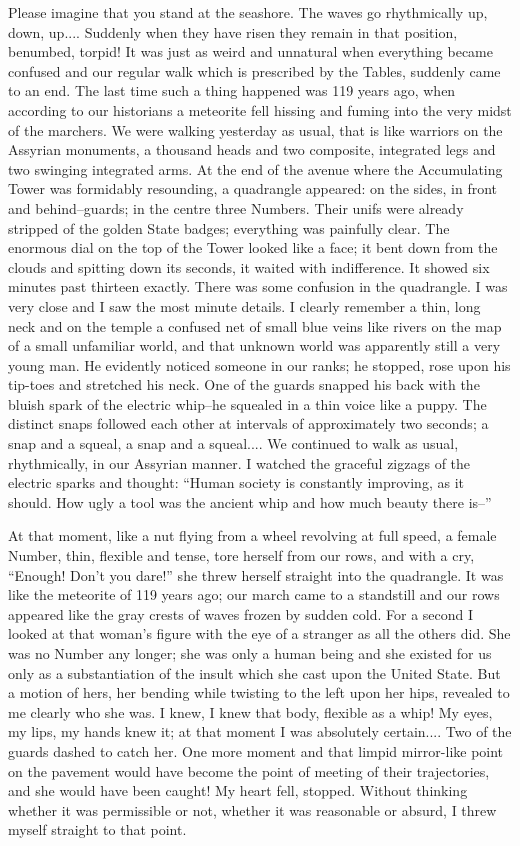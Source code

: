 \documentclass[11pt,openany]{book}
\begin{document}
Please imagine that you stand at the seashore. The waves go rhythmically up, down, up.... Suddenly when they have risen they remain in that position, benumbed, torpid! It was just as weird and unnatural when everything became confused and our regular walk which is prescribed by the Tables, suddenly came to an end. The last time such a thing happened was 119 years ago, when according to our historians a meteorite fell hissing and fuming into the very midst of the marchers. We were walking yesterday as usual, that is like warriors on the Assyrian monuments, a thousand heads and two composite, integrated legs and two swinging integrated arms. At the end of the avenue where the Accumulating Tower was formidably resounding, a quadrangle appeared: on the sides, in front and behind--guards; in the centre three Numbers. Their unifs were already stripped of the golden State badges; everything was painfully clear. The enormous dial on the top of the Tower looked like a face; it bent down from the clouds and spitting down its seconds, it waited with indifference. It showed six minutes past thirteen exactly. There was some confusion in the quadrangle. I was very close and I saw the most minute details. I clearly remember a thin, long neck and on the temple a confused net of small blue veins like rivers on the map of a small unfamiliar world, and that unknown world was apparently still a very young man. He evidently noticed someone in our ranks; he stopped, rose upon his tip-toes and stretched his neck. One of the guards snapped his back with the bluish spark of the electric whip--he squealed in a thin voice like a puppy. The distinct snaps followed each other at intervals of approximately two seconds; a snap and a squeal, a snap and a squeal.... We continued to walk as usual, rhythmically, in our Assyrian manner. I watched the graceful zigzags of the electric sparks and thought: ``Human society is constantly improving, as it should. How ugly a tool was the ancient whip and how much beauty there is--''

At that moment, like a nut flying from a wheel revolving at full speed, a female Number, thin, flexible and tense, tore herself from our rows, and with a cry, ``Enough! Don't you dare!'' she threw herself straight into the quadrangle. It was like the meteorite of 119 years ago; our march came to a standstill and our rows appeared like the gray crests of waves frozen by sudden cold. For a second I looked at that woman's figure with the eye of a stranger as all the others did. She was no Number any longer; she was only a human being and she existed for us only as a substantiation of the insult which she cast upon the United State. But a motion of hers, her bending while twisting to the left upon her hips, revealed to me clearly who she was. I knew, I knew that body, flexible as a whip! My eyes, my lips, my hands knew it; at that moment I was absolutely certain.... Two of the guards dashed to catch her. One more moment and that limpid mirror-like point on the pavement would have become the point of meeting of their trajectories, and she would have been caught! My heart fell, stopped. Without thinking whether it was permissible or not, whether it was reasonable or absurd, I threw myself straight to that point.
\end{document}
